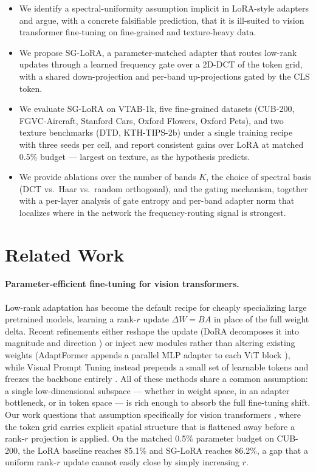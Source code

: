 \documentclass{article}
\begin{document}
\begin{itemize}
    \item We identify a spectral-uniformity assumption implicit in LoRA-style adapters and argue, with a concrete falsifiable prediction, that it is ill-suited to vision transformer fine-tuning on fine-grained and texture-heavy data.
    \item We propose SG-LoRA, a parameter-matched adapter that routes low-rank updates through a learned frequency gate over a 2D-DCT of the token grid, with a shared down-projection and per-band up-projections gated by the CLS token.
    \item We evaluate SG-LoRA on VTAB-1k, five fine-grained datasets (CUB-200, FGVC-Aircraft, Stanford Cars, Oxford Flowers, Oxford Pets), and two texture benchmarks (DTD, KTH-TIPS-2b) under a single training recipe with three seeds per cell, and report consistent gains over LoRA at matched 0.5\% budget --- largest on texture, as the hypothesis predicts.
    \item We provide ablations over the number of bands $K$, the choice of spectral basis (DCT vs.\ Haar vs.\ random orthogonal), and the gating mechanism, together with a per-layer analysis of gate entropy and per-band adapter norm that localizes where in the network the frequency-routing signal is strongest.
\end{itemize}

\section{Related Work}
\paragraph{Parameter-efficient fine-tuning for vision transformers.}
Low-rank adaptation \citep{hu2022lora} has become the default recipe for
cheaply specializing large pretrained models, learning a rank-$r$ update
$\Delta W = BA$ in place of the full weight delta. Recent refinements either
reshape the update (DoRA decomposes it into magnitude and direction
\citep{liu2024dora}) or inject new modules rather than altering existing
weights (AdaptFormer appends a parallel MLP adapter to each ViT block
\citep{chen2022adaptformer}), while Visual Prompt Tuning instead prepends a
small set of learnable tokens and freezes the backbone entirely
\citep{jia2022vpt}. All of these methods share a common assumption: a single
low-dimensional subspace — whether in weight space, in an adapter bottleneck,
or in token space — is rich enough to absorb the full fine-tuning shift. Our
work questions that assumption specifically for vision transformers
\citep{dosovitskiy2021vit, oquab2024dinov2}, where the token grid carries
explicit spatial structure that is flattened away before a rank-$r$
projection is applied. On the matched 0.5\% parameter budget on CUB-200,
the LoRA baseline reaches 85.1\% and SG-LoRA reaches 86.2\%, a gap that a
uniform rank-$r$ update cannot easily close by simply increasing $r$.
\end{document}
